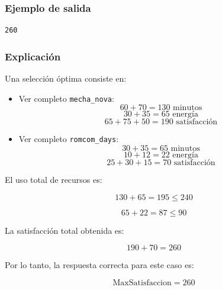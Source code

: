 \subsubsection*{Ejemplo de salida}

\begin{verbatim}
260
\end{verbatim}

\subsubsection*{Explicación}

Una selección óptima consiste en:

\begin{itemize}
    \item Ver completo \texttt{mecha\_nova}:
    \[
    60+70=130 \text{ minutos}
    \]
    \[
    30+35=65 \text{ energía}
    \]
    \[
    65+75+50=190 \text{ satisfacción}
    \]

    \item Ver completo \texttt{romcom\_days}:
    \[
    30+35=65 \text{ minutos}
    \]
    \[
    10+12=22 \text{ energía}
    \]
    \[
    25+30+15=70 \text{ satisfacción}
    \]
\end{itemize}

El uso total de recursos es:

\[
130+65=195 \leq 240
\]

\[
65+22=87 \leq 90
\]

La satisfacción total obtenida es:

\[
190+70=260
\]

Por lo tanto, la respuesta correcta para este caso es:

\[
\text{MaxSatisfaccion}=260
\]